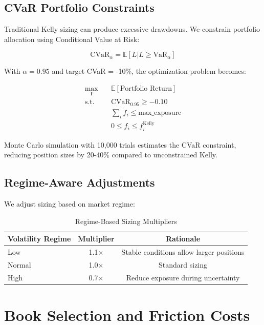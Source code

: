 \subsection{CVaR Portfolio Constraints}

Traditional Kelly sizing can produce excessive drawdowns. We constrain portfolio allocation using Conditional Value at Risk:

\begin{equation}
\text{CVaR}_\alpha = \mathbb{E}[L | L \geq \text{VaR}_\alpha]
\end{equation}

With $\alpha = 0.95$ and target CVaR = -10\%, the optimization problem becomes:

\begin{align}
\max_{\mathbf{f}} \quad & \mathbb{E}[\text{Portfolio Return}] \\
\text{s.t.} \quad & \text{CVaR}_{0.95} \geq -0.10 \\
& \sum_i f_i \leq \text{max\_exposure} \\
& 0 \leq f_i \leq f_i^{\text{Kelly}}
\end{align}

Monte Carlo simulation with 10,000 trials estimates the CVaR constraint, reducing position sizes by 20-40\% compared to unconstrained Kelly.

\subsection{Regime-Aware Adjustments}

We adjust sizing based on market regime:

\begin{table}[!ht]
\centering
\caption{Regime-Based Sizing Multipliers}
\begin{tabular}{lcc}
\toprule
 \textbf{Volatility Regime} & \textbf{Multiplier} & \textbf{Rationale} \\
\midrule
Low & 1.1× & Stable conditions allow larger positions \\
Normal & 1.0× & Standard sizing \\
High & 0.7× & Reduce exposure during uncertainty \\
\bottomrule
\end{tabular}
\end{table}

\section{Book Selection and Friction Costs}

